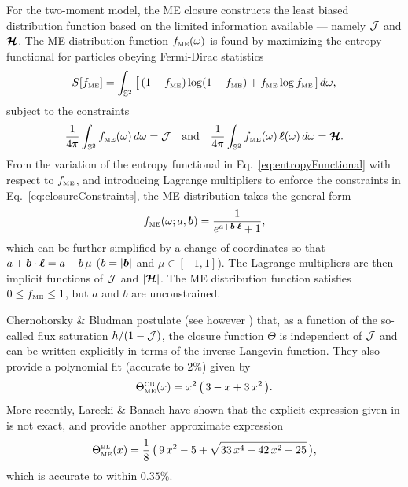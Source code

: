 For the two-moment model, the ME closure constructs the least biased distribution function based on the limited information available \cite{cernohorskyBludman_1994} --- namely $\mathcal{J}$ and $\boldsymbol{\mathcal{H}}$.  
The ME distribution function $f_{\mbox{\tiny ME}}(\omega)$ is found by maximizing the entropy functional for particles obeying Fermi-Dirac statistics
\begin{equation}
  S[f_{\mbox{\tiny ME}}] 
  = \int_{\mathbb{S}^{2}}\big[\,(1-f_{\mbox{\tiny ME}})\log(1-f_{\mbox{\tiny ME}}) + f_{\mbox{\tiny ME}}\log f_{\mbox{\tiny ME}}\,]\,d\omega,
  \label{eq:entropyFunctional}
\end{equation} 
subject to the constraints
\begin{equation}
  \frac{1}{4\pi}\int_{\mathbb{S}^{2}}f_{\mbox{\tiny ME}}(\omega)\,d\omega=\mathcal{J}
  \quad\text{and}\quad
  \frac{1}{4\pi}\int_{\mathbb{S}^{2}}f_{\mbox{\tiny ME}}(\omega)\,\boldsymbol{\ell}(\omega)\,d\omega=\boldsymbol{\mathcal{H}}.  
  \label{eq:closureConstraints}
\end{equation}
From the variation of the entropy functional in Eq.~\eqref{eq:entropyFunctional} with respect to $f_{\mbox{\tiny ME}}$, and introducing Lagrange multipliers to enforce the constraints in Eq.~\eqref{eq:closureConstraints}, the ME distribution takes the general form
\begin{equation}
  f_{\mbox{\tiny ME}}(\omega;a,\boldsymbol{b})=\frac{1}{e^{a + \boldsymbol{b}\cdot\boldsymbol{\ell}}+1}, 
  \label{eq:fME}
\end{equation}
which can be further simplified by a change of coordinates so that $a + \boldsymbol{b}\cdot\boldsymbol{\ell}=a + b\,\mu$ ($b=|\boldsymbol{b}|$ and $\mu\in[-1,1]$).  
The Lagrange multipliers are then implicit functions of $\mathcal{J}$ and $|\boldsymbol{\mathcal{H}}|$.  
The ME distribution function satisfies $0 \le f_{\mbox{\tiny ME}} \le 1$, but $a$ and $b$ are unconstrained.  

Chernohorsky \& Bludman \cite{cernohorskyBludman_1994} postulate (see however \cite{lareckiBanach_2011}) that, as a function of the so-called flux saturation $h/(1-\mathcal{J})$, the closure function $\Theta$ is independent of $\mathcal{J}$ and can be written explicitly in terms of the inverse Langevin function.  
They also provide a polynomial fit (accurate to $2\%$) given by
\begin{equation}
  \Theta_{\mbox{\tiny ME}}^{\mbox{\tiny CB}}(x)
  =x^{2}\,\big(\,3-x+3\,x^{2}\,\big).
  \label{eq:closureMECB}
\end{equation}
More recently, Larecki \& Banach \cite{lareckiBanach_2011} have shown that the explicit expression given in \cite{cernohorskyBludman_1994} is not exact, and provide another approximate expression
\begin{equation}
  \Theta_{\mbox{\tiny ME}}^{\mbox{\tiny BL}}(x)
  =\frac{1}{8}\,\big(\,9\,x^{2}-5+\sqrt{33\,x^{4}-42\,x^{2}+25}\,\big),
  \label{eq:closureMEBL}
\end{equation}
which is accurate to within $0.35\%$.  

